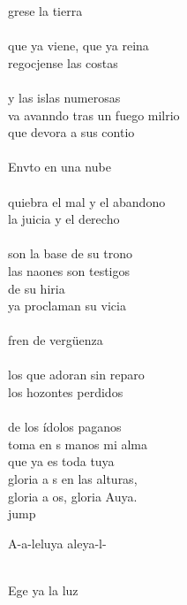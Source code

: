 \begin{cancion}%
	grese la tierra  \\
	\jump\\
que ya viene, que ya reina\\
	regocjense las costas \\
	\jump\\
y las islas numerosas\\
	va avanndo tras un fuego milrio\\
	que devora a sus contio\\
	\jump\\
	Envto en una nube \\
	\jump\\
quiebra el mal y el abandono\\
	la juicia y el derecho \\
	\jump\\
son la base de su trono\\
	las naones son testigos \\
	de su hiria\\
	ya proclaman su vicia\\
	\jump\\
	fren de vergüenza \\
	\jump\\
los que adoran sin reparo\\
	los hozontes perdidos \\
	\jump\\
de los ídolos paganos\\
	toma en s manos mi alma \\
	que ya es toda tuya\\
	gloria a s en las alturas, \\
	gloria a os, gloria Auya.\\jump\\
	\begin{chorus}%
	A-a-leluya aleya-l-\\
	\end{chorus}%
	\jump\\
	Ege ya la luz \\

\end{cancion}
